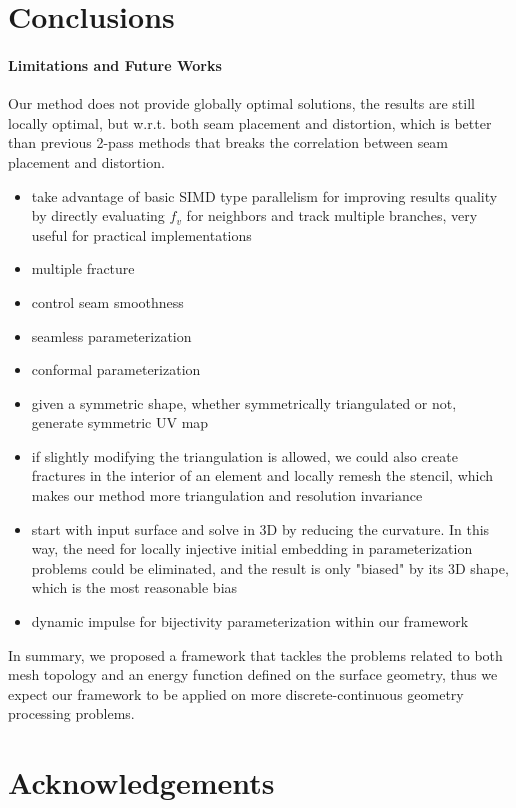 
\section{Conclusions}
\label{sec:conclusion}

\paragraph{Limitations and Future Works}
Our method does not provide globally optimal solutions, the results are still locally optimal, but w.r.t. both seam placement and distortion, which is better than previous 2-pass methods that breaks the correlation between seam placement and distortion.

\begin{itemize}
\item take advantage of basic SIMD type parallelism for improving results quality by directly evaluating $f_v$ for neighbors and track multiple branches, very useful for practical implementations
\item multiple fracture
\item control seam smoothness
\item seamless parameterization
\item conformal parameterization
\item given a symmetric shape, whether symmetrically triangulated or not, generate symmetric UV map
\item if slightly modifying the triangulation is allowed, we could also create fractures in the interior of an element and locally remesh the stencil, which makes our method more triangulation and resolution invariance
\item start with input surface and solve in 3D by reducing the curvature. In this way, the need for locally injective initial embedding in parameterization problems could be eliminated, and the result is only "biased" by its 3D shape, which is the most reasonable bias
\item dynamic impulse for bijectivity parameterization within our framework
\end{itemize}

In summary, we proposed a framework that tackles the problems related to both mesh topology and an energy function defined on the surface geometry, thus we expect our framework to be applied on more discrete-continuous geometry processing problems.

\section*{Acknowledgements} 